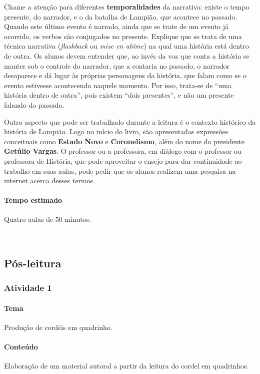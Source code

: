 \documentclass[11pt]{extarticle}
\begin{document}
Chame a atenção para diferentes \textbf{temporalidades} da narrativa: existe o tempo presente, do narrador,
e o da batalha de Lampião, que acontece no passado. Quando este último evento é narrado, ainda que 
se trate de um evento já ocorrido, os verbos são conjugados no presente. 
Explique que se trata de uma técnica narrativa (\textit{flashback} ou \textit{mise en abîme}) na qual uma história
está dentro de outra. Os alunos devem entender que, ao invés da voz que conta a história se manter 
sob o controle do narrador, que a contaria no passado, o narrador desaparece e dá lugar às próprias 
personagens da história, que falam como se o evento estivesse acontecendo naquele momento. 
Por isso, trata-se de ``uma história dentro de outra'', pois existem ``dois presentes'', e não
um presente falando do passado. 

Outro aspecto que pode ser trabalhado durante a leitura é o contexto histórico da história de Lampião. Logo no início do livro, são apresentadas expressões conceituais como \textbf{Estado Novo} e \textbf{Coronelismo}, além do nome do presidente \textbf{Getúlio Vargas}. O professor ou a professora, em diálogo com o professor ou professora
de História, que pode aproveitar o ensejo para dar continuidade ao trabalho em suas aulas,
pode pedir que os alunos realizem uma pesquisa na internet acerca desses termos.


\paragraph{Tempo estimado} Quatro aulas de 50 minutos.

 
\subsection{Pós-leitura}

\subsubsection{Atividade 1}


\paragraph{Tema} Produção de cordéis em quadrinho.

\paragraph{Conteúdo} Elaboração de um material autoral a partir da leitura
do cordel em quadrinhos.
\end{document}
